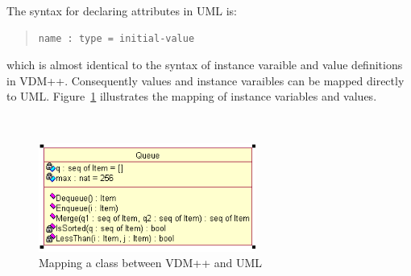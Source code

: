 \documentclass[\pformat,12pt]{article}
\newcommand{\vdmpp}{VDM++}
\begin{document}
The syntax for declaring attributes in UML is:  

\begin{quote}
\begin{verbatim}
name : type = initial-value
\end{verbatim}
\end{quote}

which is almost identical to the syntax of instance varaible and value
definitions in \vdmpp{}. Consequently values and instance varaibles
can be mapped directly to UML.  Figure~\ref{fig:queue} illustrates the mapping of
instance variables and values.

%

\begin{figure}[htb]
\begin{center}
\hspace{-2cm}
\begin{minipage}[t]{2.5in}
\end{minipage} \ \
\begin{minipage}[t]{2in}
\vspace{2cm}
\includegraphics[width=2.8in]{queueClass}
\end{minipage}
\caption{Mapping a class between \vdmpp{} and UML\label{fig:queue}}
\end{center}
\end{figure}
\end{document}
